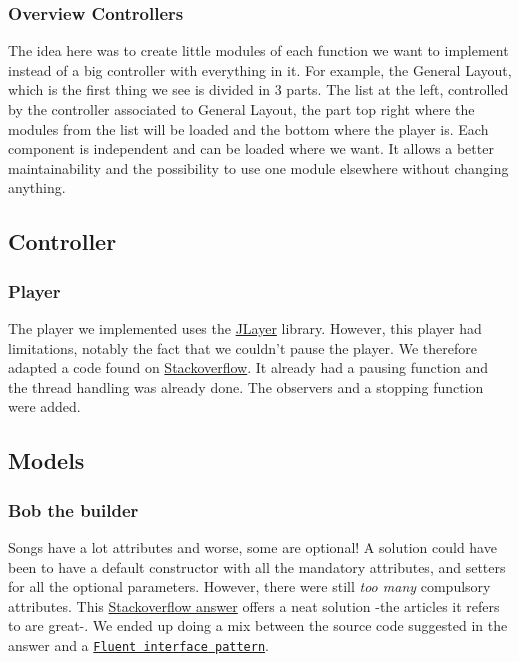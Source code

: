 \documentclass{report}
\begin{document}
\subsubsection{Overview Controllers}
The idea here was to create little modules of each function we want to implement instead of a big controller with everything in it. For example, the General Layout, which is the first thing we see is divided in 3 parts. The list at the left, controlled by the controller associated to General Layout, the part top right where the modules from the list will be loaded and the bottom where the player is. Each component is independent and can be loaded where we want. It allows a better maintainability and the possibility to use one module elsewhere without changing anything.

\subsection{Controller}

\subsubsection{Player}

The player we implemented uses the \href{http://www.javazoom.net/javalayer/javalayer.html}{JLayer} library. However, this player had limitations, notably the fact that we couldn't pause the player. We therefore adapted a code found on \href{http://stackoverflow.com/questions/12057214/jlayer-pause-and-resume-song}{Stackoverflow}. It already had a pausing function and the thread handling was already done. The observers and a stopping function were added.

\subsection{Models}

\subsubsection{Bob the builder}
Songs have a lot attributes and worse, some are optional! A solution could have been to have a default constructor with all the mandatory attributes, and setters for all the optional parameters. However, there were still \textit{too many} compulsory attributes. This \href{http://stackoverflow.com/a/40324/5795409}{Stackoverflow answer} offers a neat solution -the articles it refers to are great-. We ended up doing a mix between the source code suggested in the answer and a \href{https://dzone.com/articles/factories-builders-and-fluent-}{\texttt{Fluent interface pattern}}.
\end{document}
